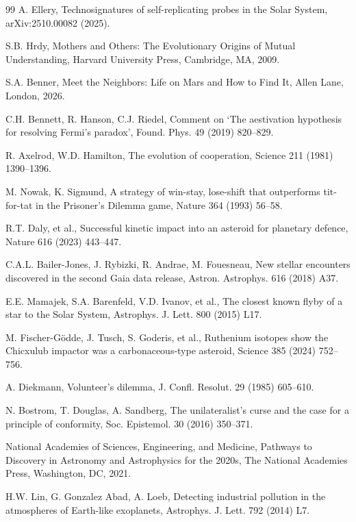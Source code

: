\documentclass[preprint,12pt]{elsarticle}
\theoremstyle{definition}
\begin{document}
\begin{thebibliography}{99}
 A. Ellery, Technosignatures of self-replicating probes in the Solar System, arXiv:2510.00082 (2025).

 S.B. Hrdy, Mothers and Others: The Evolutionary Origins of Mutual Understanding, Harvard University Press, Cambridge, MA, 2009.

 S.A. Benner, Meet the Neighbors: Life on Mars and How to Find It, Allen Lane, London, 2026.

 C.H. Bennett, R. Hanson, C.J. Riedel, Comment on `The aestivation hypothesis for resolving Fermi's paradox', Found. Phys. 49 (2019) 820--829.

 R. Axelrod, W.D. Hamilton, The evolution of cooperation, Science 211 (1981) 1390--1396.

 M. Nowak, K. Sigmund, A strategy of win-stay, lose-shift that outperforms tit-for-tat in the Prisoner's Dilemma game, Nature 364 (1993) 56--58.

 R.T. Daly, et al., Successful kinetic impact into an asteroid for planetary defence, Nature 616 (2023) 443--447.

 C.A.L. Bailer-Jones, J. Rybizki, R. Andrae, M. Fouesneau, New stellar encounters discovered in the second Gaia data release, Astron. Astrophys. 616 (2018) A37.

 E.E. Mamajek, S.A. Barenfeld, V.D. Ivanov, et al., The closest known flyby of a star to the Solar System, Astrophys. J. Lett. 800 (2015) L17.

 M. Fischer-G\"odde, J. Tusch, S. Goderis, et al., Ruthenium isotopes show the Chicxulub impactor was a carbonaceous-type asteroid, Science 385 (2024) 752--756.

 A. Diekmann, Volunteer's dilemma, J. Confl. Resolut. 29 (1985) 605--610.

 N. Bostrom, T. Douglas, A. Sandberg, The unilateralist's curse and the case for a principle of conformity, Soc. Epistemol. 30 (2016) 350--371.

 National Academies of Sciences, Engineering, and Medicine, Pathways to Discovery in Astronomy and Astrophysics for the 2020s, The National Academies Press, Washington, DC, 2021.

 H.W. Lin, G. Gonzalez Abad, A. Loeb, Detecting industrial pollution in the atmospheres of Earth-like exoplanets, Astrophys. J. Lett. 792 (2014) L7.


\end{thebibliography}
\end{document}

